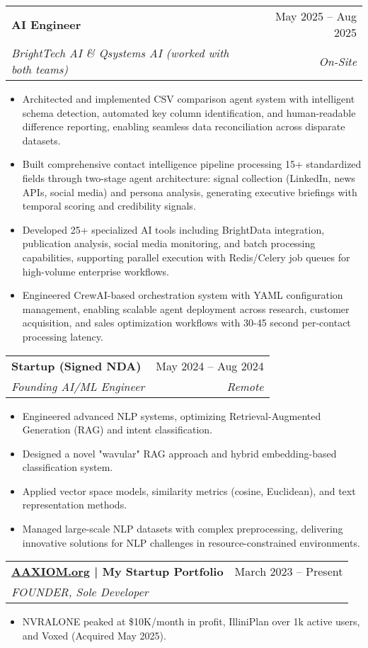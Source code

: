 \documentclass[letterpaper,10.99999999999999pt]{article}
\makeatletter
\newcommand{\resumeItem}[1]{
  \item\small{
    {#1 \vspace{-1pt}}
  }
}
\newcommand{\resumeSubheading}[4]{
  \vspace{-1pt}\item
    \begin{tabular*}{0.97\textwidth}[t]{l@{\extracolsep{\fill}}r}
      \textbf{#1} & #2 \\
      \textit{\small#3} & \textit{\small #4} \\
    \end{tabular*}\vspace{-6pt}
}
\newcommand{\resumeSubSubheading}[2]{
    \item
    \begin{tabular*}{0.97\textwidth}{l@{\extracolsep{\fill}}r}
      \textit{\small#1} & \textit{\small #2} \\
    \end{tabular*}\vspace{-6pt}
}
\newcommand{\resumeSubHeadingListEnd}{\end{itemize}}
\newcommand{\resumeItemListStart}{\begin{itemize}}
\newcommand{\resumeItemListEnd}{\end{itemize}\vspace{-5pt}}
\makeatother
\begin{document}
    \resumeSubheading
      {AI Engineer}{May 2025 – Aug 2025}
      {BrightTech AI \& Qsystems AI (worked with both teams)}{On-Site}
      \resumeItemListStart
        \resumeItem{Architected and implemented CSV comparison agent system with intelligent schema detection, automated key column identification, and human-readable difference reporting, enabling seamless data reconciliation across disparate datasets.}
        \resumeItem{Built comprehensive contact intelligence pipeline processing 15+ standardized fields through two-stage agent architecture: signal collection (LinkedIn, news APIs, social media) and persona analysis, generating executive briefings with temporal scoring and credibility signals.}
        \resumeItem{Developed 25+ specialized AI tools including BrightData integration, publication analysis, social media monitoring, and batch processing capabilities, supporting parallel execution with Redis/Celery job queues for high-volume enterprise workflows.}
        \resumeItem{Engineered CrewAI-based orchestration system with YAML configuration management, enabling scalable agent deployment across research, customer acquisition, and sales optimization workflows with 30-45 second per-contact processing latency.}
      \resumeItemListEnd

  \resumeSubheading
      {Startup (Signed NDA)}{May 2024 – Aug 2024}
      {Founding AI/ML Engineer}{Remote}
      \resumeItemListStart
        \resumeItem{Engineered advanced NLP systems, optimizing Retrieval-Augmented Generation (RAG) and intent classification.}
        \resumeItem{Designed a novel "wavular" RAG approach and hybrid embedding-based classification system.}
        \resumeItem{Applied vector space models, similarity metrics (cosine, Euclidean), and text representation methods.}
        \resumeItem{Managed large-scale NLP datasets with complex preprocessing, delivering innovative solutions for NLP challenges in resource-constrained environments.}
      \resumeItemListEnd
      
    \resumeSubheading
      {\href{https://www.aaxiom.org/}{AAXIOM.org} | My Startup Portfolio}{March 2023 – Present}
      {FOUNDER, Sole Developer}{}
      \resumeItemListStart
        \resumeItem{NVRALONE peaked at \$10K/month in profit, IlliniPlan over 1k active users, and Voxed (Acquired May 2025).}
      \resumeItemListEnd
      
\end{document}

